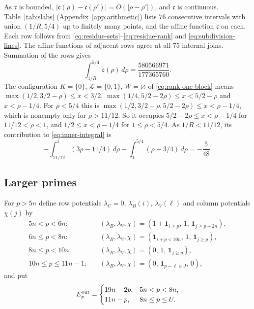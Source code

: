 \documentclass{amsart}
\numberwithin{equation}{section}
\numberwithin{table}{section}
\newcommand{\nslabs}{76}
\newcommand{\innervalue}{\frac{580566971}{177365760}}
\begin{document}
As $\mathfrak r$ is bounded,
$|\mathfrak c(\rho)-\mathfrak c(\rho')|=O(|\rho-\rho'|)$, and
$\mathfrak c$ is continuous. Table~\ref{tab:slabs}
(Appendix~\ref{app:arithmetic}) lists $\nslabs$ consecutive intervals with
union $(1/R,5/4)$ up to finitely many points, and the affine function
$\mathfrak c$ on each. Each row follows from
\eqref{eq:residue-sets}--\eqref{eq:residue-rank} and
\eqref{eq:subdivision-lines}. The affine functions of adjacent rows agree at
all $75$ internal joins. Summation of the rows gives
\begin{equation}\label{eq:inner-integral}
 \int_{1/R}^{5/4}\mathfrak c(\rho)\,d\rho=\innervalue.
\end{equation}
The configuration $K=\{0\}$, $\mathcal L=\{0,1\}$, $W=\varnothing$ of
\eqref{eq:rank-one-block} means $\max(1/2,3/2-\rho)\le x<3/2$,
$\max(1/4,5/2-2\rho)\le x<5/2-\rho$ and $x<\rho-1/4$. For $\rho<5/4$ this is
$\max(1/2,3/2-\rho,5/2-2\rho)\le x<\rho-1/4$, which is nonempty only for
$\rho>11/12$. So it occupies
$5/2-2\rho\le x<\rho-1/4$ for $11/12<\rho<1$, and
$1/2\le x<\rho-1/4$ for $1\le\rho<5/4$. As $1/R<11/12$, its contribution to
\eqref{eq:inner-integral} is
\begin{equation*}
 -\int_{11/12}^{1}(3\rho-11/4)\,d\rho
 -\int_1^{5/4}(\rho-3/4)\,d\rho=-\frac5{48}.
\end{equation*}

\subsection{Larger primes}
For $p>5n$ define row potentials $\lambda_C=0$, $\lambda_B(i)$,
$\lambda_V(\ell)$ and column potentials $\chi(j)$ by
\begin{equation*}
\begin{aligned}
5n<p<6n:&\quad
 (\lambda_B,\lambda_V,\chi)
 =(1+\mathbf1_{i\ge p},\,1,\,\mathbf1_{j\ge p+2n}),\\
6n\le p<8n:&\quad
 (\lambda_B,\lambda_V,\chi)
 =(\mathbf1_{i+p<10n},\,1,\,\mathbf1_{j\ge p}),\\
8n\le p<10n:&\quad
 (\lambda_B,\lambda_V,\chi)=(0,\,1,\,\mathbf1_{j\ge p}),\\
10n\le p\le11n-1:&\quad
 (\lambda_B,\lambda_V,\chi)=(0,\,\mathbf1_{p-\ell\in J},\,0),
\end{aligned}
\end{equation*}
and put
\begin{equation*}
 E_p^{\rm out}=
 \begin{cases}
 19n-2p,&5n<p<8n,\\
 11n-p,&8n\le p\le U.
 \end{cases}
\end{equation*}
\end{document}
